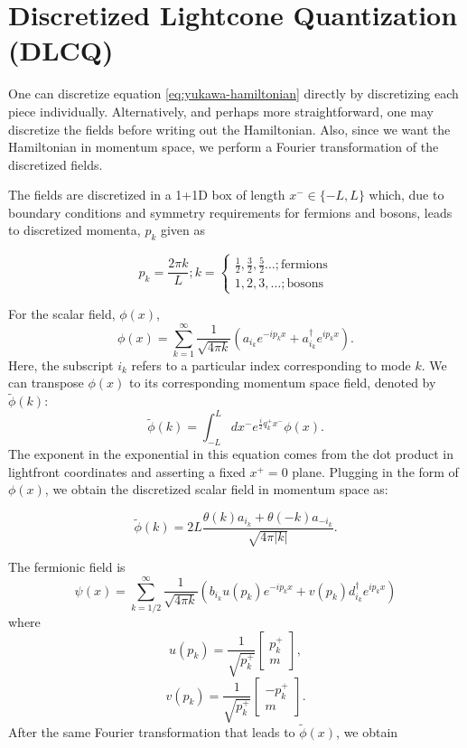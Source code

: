\section{Discretized Lightcone Quantization (DLCQ)}
\label{sec:dlcq}

One can discretize equation \ref{eq:yukawa-hamiltonian} directly by discretizing each piece individually. 
Alternatively, and perhaps more straightforward, one may discretize the fields before writing out the Hamiltonian.
Also, since we want the Hamiltonian in momentum space, we perform a Fourier transformation of the discretized fields. 

The fields are discretized in a 1+1D box of length $x^- \in \{-L, L\}$ which, due to boundary conditions and symmetry requirements for fermions and bosons, leads to discretized momenta, $p_k$ given as 

$$p_k = \frac{2\pi k}{L}; k = 
\begin{cases}
    \frac{1}{2},\frac{3}{2},\frac{5}{2} \dots ; \text{fermions}\\
    1, 2, 3, \dots ; \text{bosons}
\end{cases}$$

For the scalar field, $\phi(x)$, $$\phi(x) = \sum_{k = 1}^\infty \frac{1}{\sqrt{4\pi k}}\left(a_{i_k} e^{-ip_k x} + a_{i_k}^\dagger e^{ip_k x} \right).$$
Here, the subscript $i_k$ refers to a particular index corresponding to mode $k$. 
We can transpose $\phi(x)$ to its corresponding momentum space field, denoted by $\tilde \phi(k)$: $$\tilde \phi(k) = \int_{-L}^L dx^- e^{\frac{i}{2}q_k^+ x^-}\phi(x).$$
The exponent in the exponential in this equation comes from the dot product in lightfront coordinates and asserting a fixed $x^+ = 0$ plane. 
Plugging in the form of $\phi(x)$, we obtain the discretized scalar field in momentum space as:

\begin{equation}
    \tilde \phi(k) = 2L \frac{\theta(k)a_{i_k} + \theta(-k)a_{-i_k}}{\sqrt{4\pi |k|}}.
\end{equation}

The fermionic field is $$\psi(x) = \sum_{k = 1/2}^\infty \frac{1}{\sqrt{4\pi k}}\left(b_{i_k}u(p_k) e^{-ip_k x} + v(p_k)d_{i_k}^\dagger e^{ip_k x} \right)$$ where $$u(p_k) = \frac{1}{\sqrt{p_k^+}}\left[\begin{matrix} p^+_k \\ m \end{matrix}\right],$$ $$v(p_k) = \frac{1}{\sqrt{p_k^+}}\left[\begin{matrix} -p^+_k \\ m \end{matrix}\right].$$
After the same Fourier transformation that leads to $\tilde \phi(x)$, we obtain 


